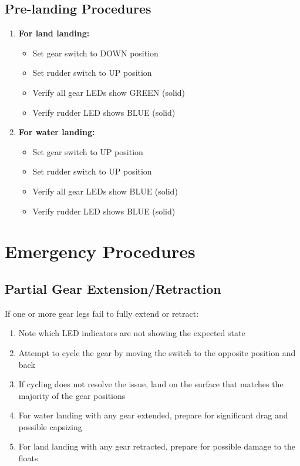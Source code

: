 \documentclass[12pt,a4paper,twoside,openright]{book}
\begin{document}
\subsection{Pre-landing Procedures}
\begin{enumerate}
    \item \textbf{For land landing:}
    \begin{itemize}
        \item Set gear switch to DOWN position
        \item Set rudder switch to UP position
        \item Verify all gear LEDs show GREEN (solid)
        \item Verify rudder LED shows BLUE (solid)
    \end{itemize}
    \item \textbf{For water landing:}
    \begin{itemize}
        \item Set gear switch to UP position
        \item Set rudder switch to UP position
        \item Verify all gear LEDs show BLUE (solid)
        \item Verify rudder LED shows BLUE (solid)
    \end{itemize}
\end{enumerate}

\section{Emergency Procedures}

\subsection{Partial Gear Extension/Retraction}
If one or more gear legs fail to fully extend or retract:
\begin{enumerate}
    \item Note which LED indicators are not showing the expected state
    \item Attempt to cycle the gear by moving the switch to the opposite position and back
    \item If cycling does not resolve the issue, land on the surface that matches the majority of the gear positions
    \item For water landing with any gear extended, prepare for significant drag and possible capsizing
    \item For land landing with any gear retracted, prepare for possible damage to the floats
\end{enumerate}
\end{document}
